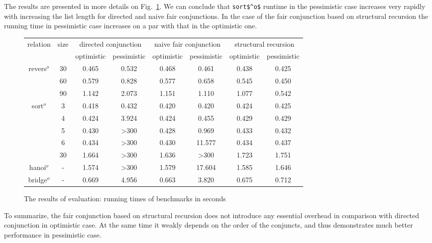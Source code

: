 The results are presented in more details on Fig.~\ref{fair:evaluation-table}. We can conclude that \lstinline{sort$^o$} runtime in the pessimistic case increases
very rapidly with increasing the list length for directed and naive fair conjunctions. In the case of the fair conjunction based on structural recursion the running time in pessimistic case
increases on a par with that in the optimistic one.

\begin{figure}[h]
  \small
  \centering
  \begin{tabular}{ c | c | c | c | c | c | c | c }
    \multirow{2}{*}{relation} & \multirow{2}{*}{size} & 
    \multicolumn{2}{c}{directed conjunction} &
    \multicolumn{2}{c}{naive fair conjunction} &
    \multicolumn{2}{c}{structural recursion} \\
    \cline{3-8}
    & & optimistic & pessimistic & optimistic & pessimistic & optimistic & pessimistic  \\ 
    \hline
    \multirow{3}{*}{revers$^o$}
                 & 30   & 0.465 & 0.532 & 0.468 & 0.461  & 0.438 & 0.425 \\
                 & 60   & 0.579 & 0.828 & 0.577 & 0.658  & 0.545 & 0.450 \\
                 & 90   & 1.142 & 2.073 & 1.151 & 1.110  & 1.077 & 0.542 \\
    \hline
    \multirow{5}{*}{sort$^o$}
                 & 3    & 0.418 & 0.432 & 0.420 & 0.420  & 0.424 & 0.425 \\
                 & 4    & 0.424 & 3.924 & 0.424 & 0.455  & 0.429 & 0.429 \\
                 & 5    & 0.430 & >300  & 0.428 & 0.969  & 0.433 & 0.432 \\
                 & 6    & 0.434 & >300  & 0.430 & 11.577 & 0.434 & 0.437 \\
                 & 30   & 1.664 & >300  & 1.636 & >300   & 1.723 & 1.751 \\ 
    \hline
    hanoi$^o$    & -    & 1.574 & >300  & 1.579 & 17.604 & 1.585 & 1.646 \\
    \hline
    bridge$^o$   & -    & 0.669 & 4.956 & 0.663 & 3.820 & 0.675 & 0.712    

  \end{tabular}
  \caption{The results of evaluation: running times of benchmarks in seconds}
  \label{fair:evaluation-table}
\end{figure}

To summarize, the fair conjunction based on structural recursion does not introduce any essential overhead in comparison with directed conjunction in optimistic case. At the same time it
weakly depends on the order of the conjuncts, and thus demonstrates much better performance in pessimistic case.
